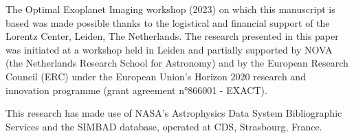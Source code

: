 \documentclass[
    usenatbib,
]{mnras}
\begin{document}
%
%
%
%
%
%
%
%
%

The Optimal Exoplanet Imaging workshop (2023) on which this manuscript is based was made possible thanks to the logistical and financial support of the Lorentz Center, Leiden, The Netherlands. 
%
The research presented in this paper was initiated at a workshop held in Leiden and partially supported by NOVA (the Netherlands Research School for Astronomy) and by the European Research Council (ERC) under the European Union's Horizon 2020 research and innovation programme (grant agreement n°866001 - EXACT).

This research has made use of NASA's Astrophysics Data System Bibliographic Services and the SIMBAD database, operated at CDS, Strasbourg, France. 
\end{document}
